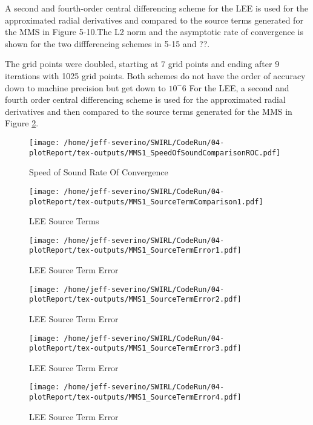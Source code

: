 A second and fourth-order central differencing scheme for the LEE is used for the approximated radial derivatives and compared to the source terms generated for the MMS in Figure 5-10.The L2 norm and the asymptotic rate of convergence is shown for the two diffferencing schemes in 5-15 and ??. 

The grid points were doubled, starting at 7 grid points and ending after 9 iterations with 1025 grid points. Both schemes do not have the order of accuracy down to machine precision but get down to $10^-6$
For the LEE, a second and fourth order central differencing scheme is used
for the approximated radial derivatives and then compared to the source terms 
generated for the MMS in Figure \ref{fig:6}. 
\begin{figure}[h!]
    \centering
    \texttt{[image: /home/jeff-severino/SWIRL/CodeRun/04-plotReport/tex-outputs/MMS1\_SpeedOfSoundComparisonROC.pdf]}
    \caption{ Speed of Sound Rate Of Convergence}
    \label{fig:SpeedOfSoundROC}
\end{figure}



\begin{figure}[h!]
    \centering
    \texttt{[image: /home/jeff-severino/SWIRL/CodeRun/04-plotReport/tex-outputs/MMS1\_SourceTermComparison1.pdf]}
    \caption{LEE Source Terms}
    \label{fig:6}
\end{figure}


\begin{figure}[h!]
    \centering
    \texttt{[image: /home/jeff-severino/SWIRL/CodeRun/04-plotReport/tex-outputs/MMS1\_SourceTermError1.pdf]}
    \caption{LEE Source Term Error}
    \label{fig:7}
\end{figure}


\begin{figure}[h!]
    \centering
    \texttt{[image: /home/jeff-severino/SWIRL/CodeRun/04-plotReport/tex-outputs/MMS1\_SourceTermError2.pdf]}
    \caption{LEE Source Term Error}
    \label{fig:7}
\end{figure}


\begin{figure}[h!]
    \centering
    \texttt{[image: /home/jeff-severino/SWIRL/CodeRun/04-plotReport/tex-outputs/MMS1\_SourceTermError3.pdf]}
    \caption{LEE Source Term Error}
    \label{fig:7}
\end{figure}


\begin{figure}[h!]
    \centering
    \texttt{[image: /home/jeff-severino/SWIRL/CodeRun/04-plotReport/tex-outputs/MMS1\_SourceTermError4.pdf]}
    \caption{LEE Source Term Error}
    \label{fig:7}
\end{figure}



